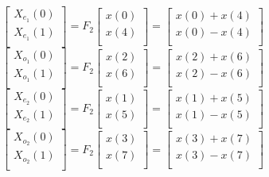 \documentclass[journal,12pt,twocolumn]{IEEEtran}
\renewcommand\thesection{\arabic{section}}
\begin{document}
\begin{enumerate}[label=\thesection.\arabic*.,ref=\thesection.\theenumi]
\begin{equation}
\begin{bmatrix}
X_{e_{1}}(0) \\ 
X_{e_{1}}(1)\\ 
\end{bmatrix}
= F_{2}
\begin{bmatrix}
x(0) \\ 
x(4) \\ 
\end{bmatrix}
=
\begin{bmatrix}
x(0)+x(4) \\ 
x(0)-x(4) \\ 
\end{bmatrix}
\end{equation}
\begin{equation}
\begin{bmatrix}
X_{o_{1}}(0) \\ 
X_{o_{1}}(1)\\ 
\end{bmatrix}
= F_{2}
\begin{bmatrix}
x(2) \\ 
x(6) \\ 
\end{bmatrix}
=
\begin{bmatrix}
x(2)+x(6) \\ 
x(2)-x(6) \\ 
\end{bmatrix}
\end{equation}
\begin{equation}
\begin{bmatrix}
X_{e_{2}}(0) \\ 
X_{e_{2}}(1)\\ 
\end{bmatrix}
= F_{2}
\begin{bmatrix}
x(1) \\ 
x(5) \\ 
\end{bmatrix}
=
\begin{bmatrix}
x(1)+x(5) \\ 
x(1)-x(5) \\ 
\end{bmatrix}
\end{equation}
\begin{equation}
\begin{bmatrix}
X_{o_{2}}(0) \\ 
X_{o_{2}}(1)\\ 
\end{bmatrix}
= F_{2}
\begin{bmatrix}
x(3) \\ 
x(7) \\ 
\end{bmatrix}
=
\begin{bmatrix}
x(3)+x(7) \\ 
x(3)-x(7) \\ 
\end{bmatrix}
\end{equation}



\end{enumerate}
\end{document}
